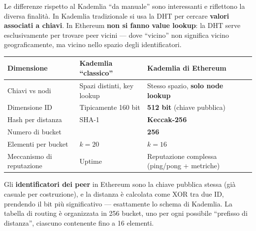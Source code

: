\documentclass[
  italian,
  openany]{book}
\newcounter{none} %
\begin{document}
Le differenze rispetto al Kademlia ``da manuale'' sono interessanti e
riflettono la diversa finalità. In Kademlia tradizionale si usa la DHT
per cercare \textbf{valori associati a chiavi}. In Ethereum \textbf{non
si fanno value lookup}: la DHT serve esclusivamente per trovare peer
vicini --- dove ``vicino'' non significa vicino geograficamente, ma
vicino nello spazio degli identificatori.

{\def\LTcaptype{none} %
\begin{longtable}[]{@{}
  >{\raggedright\arraybackslash}p{}
  >{\raggedright\arraybackslash}p{}
  >{\raggedright\arraybackslash}p{}@{}}
\toprule\noalign{}
\begin{minipage}[b]{\linewidth}\raggedright
Dimensione
\end{minipage} & \begin{minipage}[b]{\linewidth}\raggedright
Kademlia ``classico''
\end{minipage} & \begin{minipage}[b]{\linewidth}\raggedright
Kademlia di Ethereum
\end{minipage} \\
\midrule\noalign{}
\endhead
\bottomrule\noalign{}
\endlastfoot
Chiavi vs nodi & Spazi distinti, key lookup & Stesso spazio,
\textbf{solo node lookup} \\
Dimensione ID & Tipicamente 160 bit & \textbf{512 bit} (chiave
pubblica) \\
Hash per distanza & SHA-1 & \textbf{Keccak-256} \\
Numero di bucket & 160 & \textbf{256} \\
Elementi per bucket & \(k = 20\) & \(k = 16\) \\
Meccanismo di reputazione & Uptime & Reputazione complessa (ping/pong +
metriche) \\
\end{longtable}
}

Gli \textbf{identificatori dei peer} in Ethereum sono la chiave pubblica
stessa (già casuale per costruzione), e la distanza è calcolata come XOR
tra due ID, prendendo il bit più significativo --- esattamente lo schema
di Kademlia. La tabella di routing è organizzata in 256 bucket, uno per
ogni possibile ``prefisso di distanza'', ciascuno contenente fino a 16
elementi.
\end{document}
